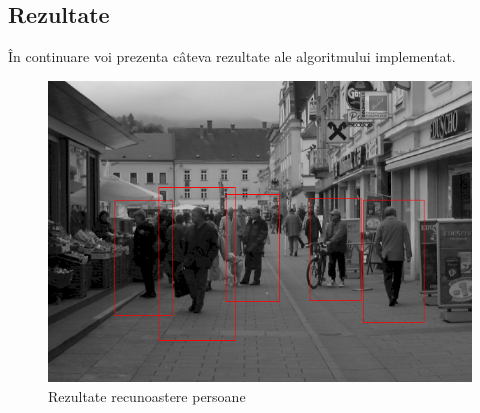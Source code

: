 \subsection{Rezultate}
În continuare voi prezenta câteva rezultate ale algoritmului implementat.

\begin{figure}[H]
\begin{center}
	\includegraphics[width=1.00\textwidth]{imagini/rezultate_cu_nms.png}
\end{center}
	\caption{Rezultate recunoastere persoane}
	\label{fig:rezultate_recunoaster_pers1}
\end{figure}

